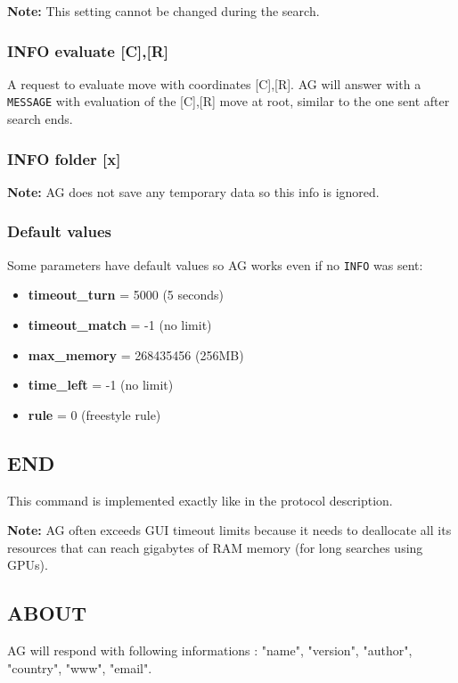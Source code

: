 \documentclass[12pt,a4paper]{article}
\begin{document}
\textbf{Note:} This setting cannot be changed during the search.

\subsubsection{INFO evaluate [C],[R]}
\label{cmd_info_evaluate}
A request to evaluate move with coordinates [C],[R]. AG will answer with a \texttt{MESSAGE} with evaluation of the [C],[R] move at root, similar to the one sent after search ends.

\subsubsection{INFO folder [x]}
\label{cmd_info_folder}
\textbf{Note:} AG does not save any temporary data so this info is ignored.

\subsubsection{Default values}
Some parameters have default values so AG works even if no \texttt{INFO} was sent:
\begin{itemize}
\item{\textbf{timeout{\_}turn } = 5000 (5 seconds)}
\item{\textbf{timeout{\_}match} = -1 (no limit)}
\item{\textbf{max{\_}memory} = 268435456 (256MB)}
\item{\textbf{time{\_}left} = -1 (no limit)}
\item{\textbf{rule} = 0 (freestyle rule)}
\end{itemize}


\subsection{END}
\label{cmd_end}
This command is implemented exactly like in the protocol description.

\textbf{Note:} AG often exceeds GUI timeout limits because it needs to deallocate all its resources that can reach gigabytes of RAM memory (for long searches using GPUs).


\subsection{ABOUT}
\label{cmd_about}
AG will respond with following informations : "name", "version", "author", "country", "www", "email".
\end{document}
